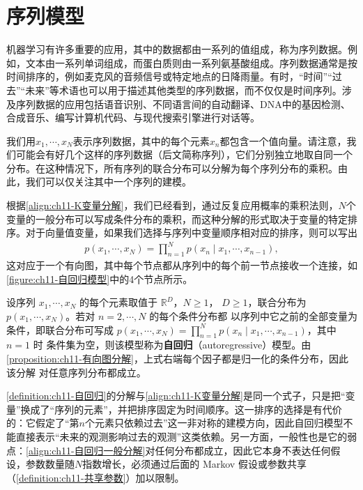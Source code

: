 \documentclass[../../main.tex]{subfiles}
\begin{document}
\section{序列模型}\label{section:ch11-序列模型}

机器学习有许多重要的应用，其中的数据都由一系列的值组成，称为序列数据。例如，文本由一系列单词组成，而蛋白质则由一系列氨基酸组成。序列数据通常是按时间排序的，例如麦克风的音频信号或特定地点的日降雨量。有时，“时间”“过去”“未来”等术语也可以用于描述其他类型的序列数据，而不仅仅是时间序列。涉及序列数据的应用包括语音识别、不同语言间的自动翻译、DNA中的基因检测、合成音乐、编写计算机代码、与现代搜索引擎进行对话等。

我们用$x_1,\cdots,x_N$表示序列数据，其中的每个元素$x_n$都包含一个值向量。请注意，我们可能会有好几个这样的序列数据（后文简称序列），它们分别独立地取自同一个分布。在这种情况下，所有序列的联合分布可以分解为每个序列分布的乘积。由此，我们可以仅关注其中一个序列的建模。

根据\eqref{align:ch11-K变量分解}，我们已经看到，通过反复应用概率的乘积法则，$N$个变量的一般分布可以写成条件分布的乘积，而这种分解的形式取决于变量的特定排序。对于向量值变量，如果我们选择与序列中变量顺序相对应的排序，则可以写出
\begin{align}
  p(x_1,\cdots,x_N) = \prod_{n=1}^{N}p(x_n\mid x_1,\cdots,x_{n-1}),
  \label{align:ch11-自回归一般分解}
\end{align}
这对应于一个有向图，其中每个节点都从序列中的每个前一节点接收一个连接，如\cref{figure:ch11-自回归模型}中的4个节点所示。

\begin{definition}[自回归模型]\label{definition:ch11-自回归}
设序列 $x_1,\cdots,x_N$ 的每个元素取值于 $\mathbb{R}^{D}$，$N\geqslant1$，
$D\geqslant1$，联合分布为 $p(x_1,\cdots,x_N)$。若对 $n=2,\cdots,N$ 的每个条件分布都
以序列中它之前的全部变量为条件，即联合分布可写成
$p(x_1,\cdots,x_N)=\prod_{n=1}^{N}p(x_n\mid x_1,\cdots,x_{n-1})$，其中 $n=1$ 时
条件集为空，则该模型称为\textbf{自回归}（autoregressive）模型。由
\cref{proposition:ch11-有向图分解}，上式右端每个因子都是归一化的条件分布，因此该分解
对任意序列分布都成立。
\end{definition}

\begin{remark}
\cref{definition:ch11-自回归}的分解与\eqref{align:ch11-K变量分解}是同一个式子，只是把“变量”换成了“序列的元素”，并把排序固定为时间顺序。这一排序的选择是有代价的：它假定了“第$n$个元素只依赖过去”这一非对称的建模方向，因此自回归模型不能直接表示“未来的观测影响过去的观测”这类依赖。另一方面，一般性也是它的弱点：\eqref{align:ch11-自回归一般分解}对任何分布都成立，因此它本身不表达任何假设，参数数量随$N$指数增长，必须通过后面的 Markov 假设或参数共享（\cref{definition:ch11-共享参数}）加以限制。
\end{remark}
\end{document}
